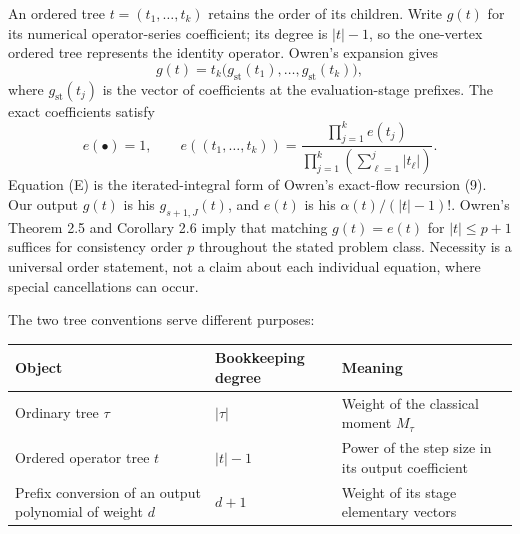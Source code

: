 \documentclass[
  11pt,
  a4paper,
]{scrartcl}
\newcounter{none} %
\begin{document}
An ordered tree \(t=(t_1,\ldots,t_k)\) retains the order of its
children. Write \(g(t)\) for its numerical operator-series coefficient;
its degree is \(|t|-1\), so the one-vertex ordered tree represents the
identity operator. Owren's expansion gives \[
g(t)=t_k\bigl(g_{\mathrm{st}}(t_1),\ldots,g_{\mathrm{st}}(t_k)\bigr),
\tag{O}
\] where \(g_{\mathrm{st}}(t_j)\) is the vector of coefficients at the
evaluation-stage prefixes. The exact coefficients satisfy \[
e(\bullet)=1,\qquad
e((t_1,\ldots,t_k))
=\frac{\prod_{j=1}^k e(t_j)}{
\prod_{j=1}^k\left(\sum_{\ell=1}^j|t_\ell|\right)}.
\tag{E}
\] Equation (E) is the iterated-integral form of Owren's exact-flow
recursion (9). Our output \(g(t)\) is his \(g_{s+1,J}(t)\), and \(e(t)\)
is his \(\alpha(t)/(|t|-1)!\). Owren's Theorem 2.5 and Corollary 2.6
imply that matching \(g(t)=e(t)\) for \(|t|\leq p+1\) suffices for
consistency order \(p\) throughout the stated problem class. Necessity
is a universal order statement, not a claim about each individual
equation, where special cancellations can occur.

The two tree conventions serve different purposes:


{\def\LTcaptype{none} %
\begin{longtable}[]{@{}
  >{\raggedright\arraybackslash}p{}
  >{\raggedleft\arraybackslash}p{}
  >{\raggedright\arraybackslash}p{}@{}}
\toprule\noalign{}
\begin{minipage}[b]{\linewidth}\raggedright
Object
\end{minipage} & \begin{minipage}[b]{\linewidth}\raggedleft
Bookkeeping degree
\end{minipage} & \begin{minipage}[b]{\linewidth}\raggedright
Meaning
\end{minipage} \\
\midrule\noalign{}
\endhead
\bottomrule\noalign{}
\endlastfoot
Ordinary tree \(\tau\) & \(|\tau|\) & Weight of the classical moment
\(M_\tau\) \\
Ordered operator tree \(t\) & \(|t|-1\) & Power of the step size in its
output coefficient \\
Prefix conversion of an output polynomial of weight \(d\) & \(d+1\) &
Weight of its stage elementary vectors \\
\end{longtable}
}
\end{document}
